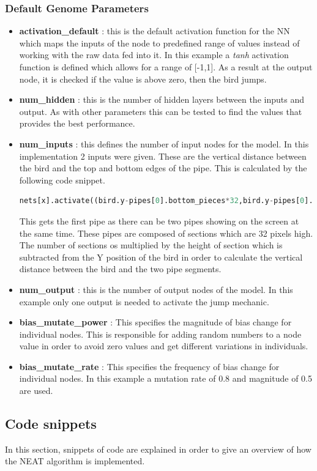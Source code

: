 \documentclass[conference]{IEEEtran}
\begin{document}
\subsubsection{Default Genome Parameters}
\begin{itemize}
	\item \textbf{activation\_default} : this is the default activation function for the NN which maps the inputs of the node to predefined range of values instead of working with the raw data fed into it. In this example a \textit{tanh} activation function is defined which allows for a range of [-1,1]. As a result at the output node, it is checked if the value is above zero, then the bird jumps.
	\item \textbf{num\_hidden} : this is the number of hidden layers between the inputs and output. As with other parameters this can be tested to find the values that provides the best performance. 
	\item \textbf{num\_inputs} : this defines the number of input nodes for the model. In this implementation 2 inputs were given. These are the vertical distance between the bird and the top and bottom edges of the pipe. This is calculated by the following code snippet.
	\begin{lstlisting}[language=Python, caption=Calculating inputs]
		nets[x].activate((bird.y-pipes[0].bottom_pieces*32,bird.y-pipes[0].top_pieces*32))	\end{lstlisting}
	This gets the first pipe as there can be two pipes showing on the screen at the same time. These pipes are composed of sections which are 32 pixels high. The number of sections os multiplied by the height of section which is subtracted from the Y position of the bird in order to calculate the vertical distance between the bird and the two pipe segments.
	\item \textbf{num\_output} : this is the number of output nodes of the model. In this example only one output is needed to activate the jump mechanic.
	\item \textbf{bias\_mutate\_power} : This specifies the magnitude of bias change for individual nodes. This is responsible for adding random numbers to a node value in order to avoid zero values and get different variations in individuals.
	\item \textbf{bias\_mutate\_rate} : This specifies the frequency of bias change for individual nodes. In this example a mutation rate of 0.8 and magnitude of 0.5 are used.
\end{itemize}
\subsection{Code snippets}
In this section, snippets of code are explained in order to give an overview of how the NEAT algorithm is implemented.
\end{document}
